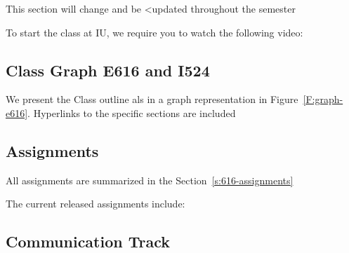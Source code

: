 \begin{WARNING}
This section will change and be <updated throughout the semester
\end{WARNING}

\begin{IU}

To start the class at IU, we require you to watch the following video:



\end{IU}

\subsection{Class Graph E616 and I524}
\label{s:graph-616}

We present the Class outline als in a graph representation in
Figure~\ref{F:graph-e616}. Hyperlinks to the specific sections are included





\subsection{Assignments}

All assignments are summarized in the Section~\ref{s:616-assignments}

The current released assignments include:


\subsection{Communication Track}


